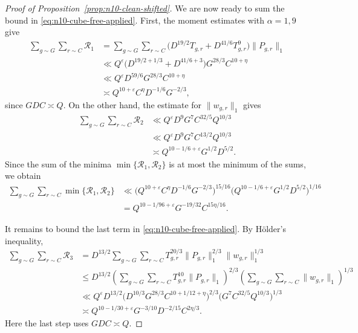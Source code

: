 \documentclass[a4paper,11pt, twoside,reqno]{amsart}
\theoremstyle{plain}
\theoremstyle{definition}
\theoremstyle{remark}
\newcommand{\ve}{\varepsilon}
\renewcommand{\leq}{\leqslant}
\numberwithin{equation}{section}
\begin{document}
\begin{proof}[Proof of Proposition~\ref{prop:n10-clean-shifted}]
We are now ready to sum the bound in
\eqref{eq:n10-cube-free-applied}.
First, the moment estimates with $\alpha=1,9$ give
\[
\begin{split}
\sum_{g\sim G}\sum_{r\sim C} \mathcal R_1
&=\sum_{g\sim G}\sum_{r\sim C}
\bigl(D^{19/2}T_{g,r}
+D^{41/6}T_{g,r}^{9}\bigr)
\|P_{g,r}\|_1\\
&\ll
Q^\ve
\bigl(D^{19/2+1/3}+D^{41/6+3}\bigr)
G^{28/3}C^{10+\eta}\\
&\ll
Q^\ve D^{59/6}G^{28/3}C^{10+\eta}\\
&\asymp
Q^{10+\ve}C^\eta D^{-1/6}G^{-2/3},
\end{split}
\]
since $GDC\asymp Q$.
On the other hand, the estimate for $\|w_{g,r}\|_1$ gives
\[
\begin{split}
\sum_{g\sim G}\sum_{r\sim C} \mathcal R_2
&\ll
Q^\ve D^9G^7C^{32/5}Q^{10/3}\\
&\ll
Q^\ve D^9G^7C^{13/2}Q^{10/3}\\
&\asymp
Q^{10-1/6+\ve}G^{1/2}D^{5/2}.
\end{split}
\]
Since the sum of the minima $\min\{\mathcal R_1,\mathcal R_2\}$
is at most the minimum
of the sums, we obtain
\[
\begin{split}
\sum_{g\sim G}\sum_{r\sim C}
\min\{\mathcal R_1,\mathcal R_2\}
&\ll
\bigl(Q^{10+\ve}C^\eta D^{-1/6}G^{-2/3}\bigr)^{15/16}
\bigl(Q^{10-1/6+\ve}G^{1/2}D^{5/2}\bigr)^{1/16}\\
&=
Q^{10-1/96+\ve}G^{-19/32}C^{15\eta/16}.
\end{split}
\]

It remains to bound the last term in
\eqref{eq:n10-cube-free-applied}.
By H\"older's inequality,
\[
\begin{split}
\sum_{g\sim G}\sum_{r\sim C} \mathcal R_3
&= D^{13/2}
\sum_{g\sim G}\sum_{r\sim C}
T_{g,r}^{20/3}
\|P_{g,r}\|_1^{2/3}
\|w_{g,r}\|_1^{1/3}\\
&\leq
D^{13/2}
\left(
\sum_{g\sim G}\sum_{r\sim C}
T_{g,r}^{10}\|P_{g,r}\|_1
\right)^{2/3}
\left(
\sum_{g\sim G}\sum_{r\sim C}
\|w_{g,r}\|_1
\right)^{1/3}\\
&\ll
Q^\ve D^{13/2}
\bigl(D^{10/3}G^{28/3}C^{10+1/12+\eta}\bigr)^{2/3}
\bigl(G^7C^{32/5}Q^{10/3}\bigr)^{1/3}\\
&\asymp
Q^{10-1/30+\ve}
G^{-3/10}D^{-2/15}C^{2\eta/3}.
\end{split}
\]
Here the last step uses $GDC\asymp Q$.


\end{proof}
\end{document}
